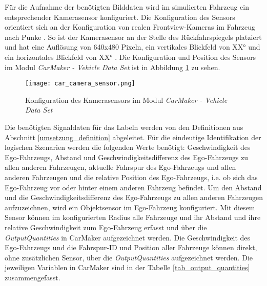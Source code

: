 Für die Aufnahme der benötigten Bilddaten wird im simulierten Fahrzeug ein entsprechender Kamerasensor konfiguriert. Die Konfiguration des Sensors orientiert sich an der Konfiguration von realen Frontview-Kameras im Fahrzeug nach Punke \cite{punke2015kamera}. So ist der Kamerasensor an der Stelle des Rückfahrspiegels platziert und hat eine Auflösung von 640x480 Pixeln, ein vertikales Blickfeld von XX° und ein horizontales Blickfeld von XX° . Die Konfiguration und Position des Sensors im Modul \textit{CarMaker - Vehicle Data Set} ist in Abbildung \ref{fig_car_camera_sensor} zu sehen.

\begin{figure}[h]
\centering
\texttt{[image: car\_camera\_sensor.png]}
\caption{Konfiguration des Kamerasensors im Modul \textit{CarMaker - Vehicle Data Set} \cite{ipg2018carmaker}}
\label{fig_car_camera_sensor}
\end{figure}

Die benötigten Signaldaten für das Labeln werden von den Definitionen aus Abschnitt \ref{umsetzung_definition} abgeleitet. Für die eindeutige Identifikation der logischen Szenarien werden die folgenden Werte benötigt: Geschwindigkeit des Ego-Fahrzeugs, Abstand und Geschwindigkeitsdifferenz des Ego-Fahrzeugs zu allen anderen Fahrzeugen, aktuelle Fahrspur des Ego-Fahrzeugs und allen anderen Fahrzeugen und die relative Position des Ego-Fahrzeugs, i.e. ob sich das Ego-Fahrzeug vor oder hinter einem anderen Fahrzeug befindet. Um den Abstand und die Geschwindigkeitsdifferenz des Ego-Fahrzeugs zu allen anderen Fahrzeugen aufzuzeichnen, wird ein Objektsensor im Ego-Fahrzeug konfiguriert. Mit diesem Sensor können im konfigurierten Radius alle Fahrzeuge und ihr Abstand und ihre relative Geschwindigkeit zum Ego-Fahrzeug erfasst und über die \textit{OutputQuantities} in CarMaker aufgezeichnet werden. Die Geschwindigkeit des Ego-Fahrzeugs und die Fahrspur-ID und Position aller Fahrzeuge können direkt, ohne zusätzlichen Sensor, über die \textit{OutputQuantities} aufgezeichnet werden. Die jeweiligen Variablen in CarMaker sind in der Tabelle \ref{tab_output_quantities} zusammengefasst.

